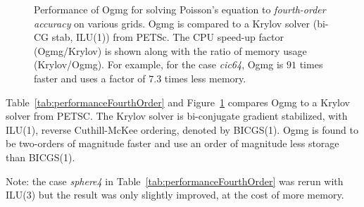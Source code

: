 \begin{figure}[hbt]
\begin{center}
\end{center}
\caption{Performance of Ogmg for solving Poisson's equation to {\em fourth-order accuracy} on various grids.
Ogmg is compared to a Krylov solver (bi-CG stab, ILU(1)) from PETSc.
  The CPU speed-up factor (Ogmg/Krylov) is shown along with the ratio of memory usage (Krylov/Ogmg). For example,
 for the case {\em cic64}, Ogmg is $91$ times faster and uses a factor of $7.3$ times less memory.}
\label{fig:performanceFourthOrder} 
\end{figure}

Table~\ref{tab:performanceFourthOrder} and Figure~\ref{fig:performanceFourthOrder} compares Ogmg to a Krylov solver from PETSC. 
The Krylov solver is bi-conjugate gradient stabilized, with ILU(1), reverse Cuthill-McKee ordering, denoted by BICGS(1). 
Ogmg is found to be two-orders of magnitude faster and use an order of magnitude less storage than BICGS(1). 

Note: the case {\em sphere4} in Table~\ref{tab:performanceFourthOrder} was rerun with ILU(3) but the result was only slightly improved,
at the cost of more memory. 



